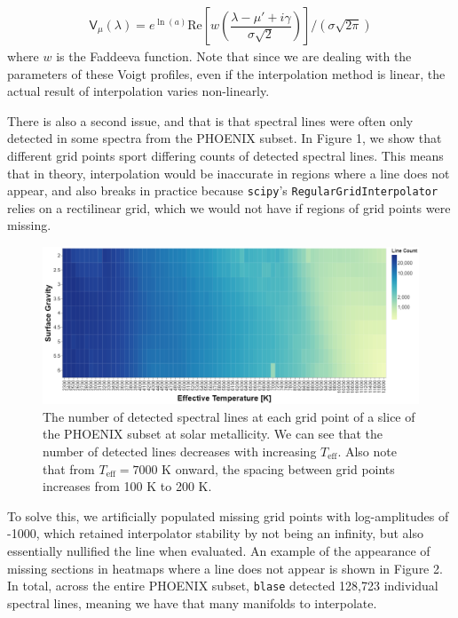 \documentclass[twocolumn]{aastex631}
\begin{document}
\begin{gather}
    \mathsf{V}_\mu(\lambda) = e^{\ln(a)}\mathrm{Re}\left[w\left(\dfrac{\lambda - \mu' + i\gamma}{\sigma\sqrt{2}}\right)\right] \bigg/ \left(\sigma\sqrt{2\pi}\right)
\end{gather}
where $w$ is the Faddeeva function. Note that since we are dealing with 
the parameters of these Voigt profiles, even if the interpolation method is 
linear, the actual result of interpolation varies non-linearly.

There is also a second issue, and that is that spectral lines were often
only detected in some spectra from the PHOENIX subset. In Figure 1, we show
that different grid points sport differing counts of detected spectral lines.
This means that in theory, interpolation would be inaccurate in regions where 
a line does not appear, and also breaks in practice because \texttt{scipy}'s 
\texttt{RegularGridInterpolator} relies on a rectilinear grid, which we would not 
have if regions of grid points were missing. 

\begin{figure}[t!]
    \centering
    \includegraphics[width=\textwidth]{images/figure1.png}
    \caption{The number of detected spectral lines at each grid point of 
    a slice of the PHOENIX subset at solar metallicity. We can see that
    the number of detected lines decreases with increasing $T_{\mathrm{eff}}$.
    Also note that from $T_{\mathrm{eff}} = 7000$ K onward, the spacing 
    between grid points increases from 100 K to 200 K.}
\end{figure}

To solve this, we artificially
populated missing grid points with log-amplitudes of -1000, which retained
interpolator stability by not being an infinity, but also essentially 
nullified the line when evaluated. An example of the appearance of missing 
sections in heatmaps where a line does not appear is shown in Figure 2. 
In total, across the entire PHOENIX subset, \texttt{blase} detected 
128,723 individual spectral lines, meaning we have that many manifolds to 
interpolate.
\end{document}
